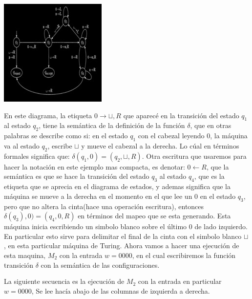\documentclass[10pt]{report}
\begin{document}
{    \begin{center}
        \includegraphics{Im_1.jpg}
    \end{center}
    \newline
    En este diagrama, la etiqueta $0\rightarrow \sqcup,R$ que aparecé en la transición del estado $q_{1}$ al estado $q_{2}$,
    tiene la semántica de la definición de la función $\delta$, que en otras palabras se describe como si:\newline
    en el estado $q_{1}$ con el cabezal leyendo $0$, la máquina va al estado $q_{2}$, escribe $\sqcup$ y mueve el cabezal
    a la derecha.\newline
    Lo cúal en términos formales significa que: $\delta(q_{1},0) = (q_{2},\sqcup, R)$.
    Otra escritura que usaremos para hacer la notación en este ejemplo mas compacta,
    es denotar: $0\leftarrow R$, que la semántica es que se hace la transición del estado $q_{3}$ al estado $q_{4}$, que
    es la etiqueta que se aprecia en el diagrama de estados, y ademas significa que la máquina se mueve a la derecha en
    el momento en el que lee un $0$ en el estado $q_{3}$, pero que no altera la cinta(\no hace una operación escritura),
    entonces $\delta(q_{3}),0) = (q_{4},0,R)$ en términos del mapeo que se esta generando.\newline
    Esta máquina inicia escribiendo un simbolo blanco sobre el último $0$ de lado izquierdo. En particular esto sirve
    para delimitar el final de la cinta con el simbolo blanco $\sqcup$, en esta particular máquina de Turing.
    \newline
    Ahora vamos a hacer una ejecución de esta maquina, $M_{2}$ con la entrada $w = 0000$, en el cual escribiremos la función
    transición $\delta$ con la semántica de las configuraciones.

    La siguiente secuencia es la ejecución de $M_{2}$ con la entrada en particular $w = 0000$,
    Se lee hacía abajo de las columnas de izquierda a derecha.

}
\end{document}
